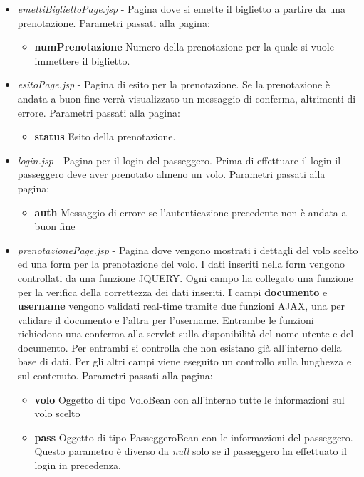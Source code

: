 \documentclass[a4paper,10pt]{article}
\begin{document}
\begin{itemize}
 \item \textit{emettiBigliettoPage.jsp} - Pagina dove si emette il biglietto a partire da una prenotazione. 
 			Parametri passati alla pagina:
			\begin{itemize}
			 \item \textbf{numPrenotazione} Numero della prenotazione per la quale si vuole immettere il biglietto.
			\end{itemize}
			
 \item \textit{esitoPage.jsp} - Pagina di esito per la prenotazione. Se la prenotazione \`e andata a buon fine verr\`a visualizzato un messaggio di conferma,
				altrimenti di errore.
 			Parametri passati alla pagina:
			\begin{itemize}
			 \item \textbf{status} Esito della prenotazione.
			\end{itemize}
			
 \item \textit{login.jsp} - Pagina per il login del passeggero. Prima di effettuare il login il passeggero deve aver prenotato almeno un volo.
			Parametri passati alla pagina:
			\begin{itemize}
			 \item \textbf{auth} Messaggio di errore se l'autenticazione precedente non \`e andata a buon fine
			\end{itemize}
			
 \item \textit{prenotazionePage.jsp} - Pagina dove vengono mostrati i dettagli del volo scelto ed una form per la prenotazione del volo.
				      I dati inseriti nella form vengono controllati da una funzione JQUERY. Ogni campo ha collegato una funzione per la verifica della correttezza
				      dei dati inseriti. I campi \textbf{documento} e \textbf{username} vengono validati real-time tramite due funzioni AJAX, una per validare il documento e l'altra per l'username.
				      Entrambe le funzioni richiedono una conferma alla servlet sulla disponibilit\`a del nome utente e del documento. Per entrambi si controlla che non esistano gi\`a all'interno
				      della base di dati. Per gli altri campi viene eseguito un controllo sulla lunghezza e sul contenuto.
 			Parametri passati alla pagina:
			\begin{itemize}
			 \item \textbf{volo} Oggetto di tipo VoloBean con all'interno tutte le informazioni sul volo scelto
			 \item \textbf{pass} Oggetto di tipo PasseggeroBean con le informazioni del passeggero. Questo parametro \`e diverso da \textit{null} 
				solo se il passeggero ha effettuato il login in precedenza.
			\end{itemize}
			

\end{itemize}
\end{document}
